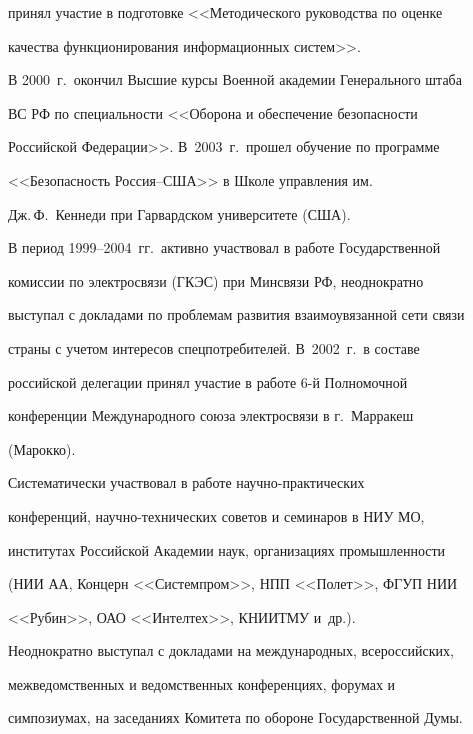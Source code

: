 принял участие в подготовке <<Методического руководства по оценке 


качества функционирования информационных систем>>.





В 2000~г.\ окончил Высшие курсы Военной академии Генерального штаба 


ВС РФ по специальности <<Оборона и обеспечение безопасности 


Российской Федерации>>. В~2003~г.\ прошел обучение по программе 


<<Безопасность Рос\-сия--США>> в Школе управления им.\ 


Дж.\,Ф.~Кеннеди при Гарвардском университете (США).





В период 1999--2004~гг.\ активно участвовал в работе Государственной 


комиссии по электросвязи (ГКЭС) при Минсвязи РФ, неоднократно 


выступал с докладами по проблемам развития взаимоувязанной сети связи 


страны с учетом интересов спецпотребителей. В~2002~г.\ в составе 


российской делегации принял участие в работе 6-й Полномочной 


конференции Международного союза электросвязи в г.~Мар\-ра\-кеш 


(Марокко).





Систематически участвовал в работе на\-уч\-но-прак\-ти\-че\-ских 


конференций, на\-уч\-но-тех\-ни\-че\-ских советов и семинаров в НИУ МО, 


институтах Российской Академии наук, организациях промышленности 


(НИИ АА, Концерн <<Системпром>>, НПП <<Полет>>, ФГУП НИИ 


<<Рубин>>, ОАО <<Интелтех>>, КНИИТМУ и~др.).





Неоднократно выступал с докладами на международных, всероссийских, 


межведомственных и ведомственных конференциях, форумах и 


симпозиумах, на заседаниях Комитета по обороне Государственной Думы.





